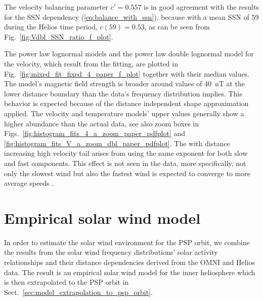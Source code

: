 The velocity balancing parameter $c' = 0.557$ is in good agreement with the results for the SSN dependency (\ref{eq:balance_with_ssn}), because with a mean SSN of 59 during the Helios time period, $c(59) = 0.53$, as can be seen from Fig.~\ref{fig:Vdbl_SSN_ratio_f_plot}.

The power law lognormal models and the power law double lognormal model for the velocity, which result from the fitting, are plotted in Fig.~\ref{fig:mixed_fit_fixed_4_paper_f_plot} together with their median values. The model’s magnetic field strength is broader around values of \SI{40}{nT} at the lower distance boundary than the data's frequency distribution implies. This behavior is expected because of the distance independent shape approximation applied. The velocity and temperature models’ upper values generally show a higher abundance than the actual data, see also zoom boxes in Figs.~\ref{fig:histogram_fits_4_a_zoom_paper_pdfplot} and \ref{fig:histogram_fits_V_a_zoom_dbl_paper_pdfplot}. The with distance increasing high velocity tail arises from using the same exponent for both slow and fast components. This effect is not seen in the data, more specifically, not only the slowest wind but also the fastest wind is expected to converge to more average speeds \citep{Sanchez-Diaz2016}.


\section{Empirical solar wind model}
\label{sec:empirical_solar_wind_model}
In order to estimate the solar wind environment for the PSP orbit, we combine the results from the solar wind frequency distributions’ solar activity relationships and their distance dependencies derived from the OMNI and Helios data. The result is an empirical solar wind model for the inner heliosphere which is then extrapolated to the PSP orbit in Sect.~\ref{sec:model_extrapolation_to_psp_orbit}.

